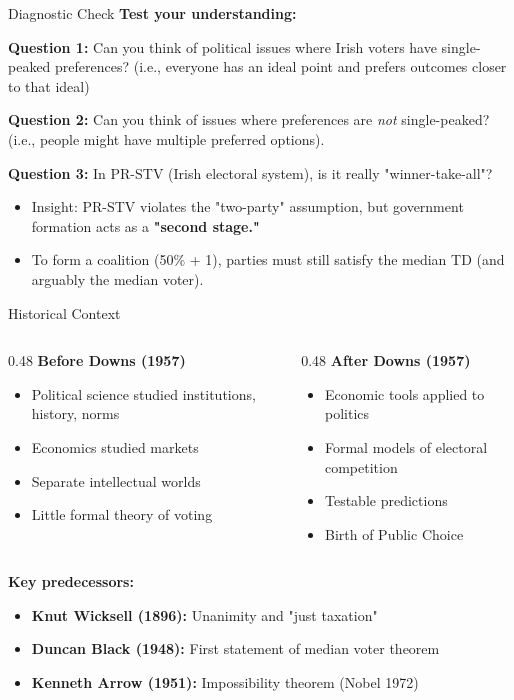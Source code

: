 \documentclass[10pt]{beamer}
\begin{document}
\begin{frame}{Diagnostic Check}
\textbf{Test your understanding:}

\textbf{Question 1:} Can you think of political issues where Irish voters have single-peaked preferences? (i.e., everyone has an ideal point and prefers outcomes closer to that ideal)

\textbf{Question 2:} Can you think of issues where preferences are \textit{not} single-peaked? (i.e., people might have multiple preferred options).

\textbf{Question 3:} In PR-STV (Irish electoral system), is it really "winner-take-all"?
\begin{itemize}
\item \alert{Insight:} PR-STV violates the "two-party" assumption, but government formation acts as a \textbf{"second stage."}
\item To form a coalition (50\% + 1), parties must still satisfy the median TD (and arguably the median voter).
\end{itemize}
\end{frame}

\begin{frame}{Historical Context}
\begin{columns}
\begin{column}{0.48\textwidth}
\textbf{Before Downs (1957)}
\begin{itemize}
\item Political science studied institutions, history, norms
\item Economics studied markets
\item Separate intellectual worlds
\item Little formal theory of voting
\end{itemize}
\end{column}


\begin{column}{0.48\textwidth}
\textbf{After Downs (1957)}
\begin{itemize}
\item Economic tools applied to politics
\item Formal models of electoral competition
\item Testable predictions
\item Birth of Public Choice
\end{itemize}
\end{column}
\end{columns}



\textbf{Key predecessors:}
\begin{itemize}
\item \textbf{Knut Wicksell (1896):} Unanimity and "just taxation"
\item \textbf{Duncan Black (1948):} First statement of median voter theorem
\item \textbf{Kenneth Arrow (1951):} Impossibility theorem (Nobel 1972)
\end{itemize}
\end{frame}
\end{document}
